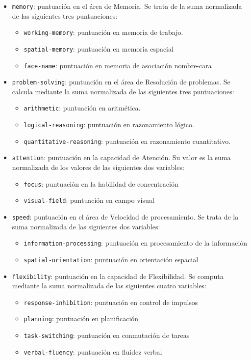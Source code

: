 \begin{itemize}
\item {\tt memory}: puntuación en el área de Memoria. Se trata de la suma normalizada de las siguientes tres puntuaciones:
  \begin{itemize}
  \item {\tt working-memory}: puntuación en memoria de trabajo.
  \item {\tt spatial-memory}: puntuación en memoria espacial
  \item {\tt face-name}: puntuación en memoria de asociación nombre-cara
  \end{itemize}
\item {\tt problem-solving}: puntuación en el área de Resolución de problemas. Se calcula mediante la suma normalizada de las siguientes tres puntuaciones:
  \begin{itemize}
  \item {\tt arithmetic}: puntuación en aritmética.
  \item {\tt logical-reasoning}: puntuación en razonamiento lógico.
  \item {\tt quantitative-reasoning}: puntuación en razonamiento cuantitativo.
  \end{itemize}
\item {\tt attention}: puntuación en la capacidad de Atención. Su valor es la suma normalizada de los valores de las siguientes dos variables:
  \begin{itemize}
  \item {\tt focus}: puntuación en la habilidad de concentración
  \item {\tt visual-field}: puntuación en campo visual
  \end{itemize}
\item {\tt speed}: puntuación en el área de Velocidad de procesamiento. Se trata de la suma normalizada de las siguientes dos variables:
  \begin{itemize}
  \item {\tt information-processing}: puntuación en procesamiento de la información
  \item {\tt spatial-orientation}: puntuación en orientación espacial
  \end{itemize}
\item {\tt flexibility}: puntuación en la capacidad de Flexibilidad. Se computa mediante la suma normalizada de las siguientes cuatro variables:
  \begin{itemize}
  \item {\tt response-inhibition}: puntuación en control de impulsos
  \item {\tt planning}: puntuación en planificación
  \item {\tt task-switching}: puntuación en conmutación de tareas
  \item {\tt verbal-fluency}: puntuación en fluidez verbal
  \end{itemize}
\end{itemize}

